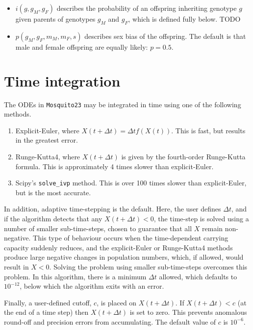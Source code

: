 \documentclass[11pt,a4paper]{article}
\begin{document}
\begin{itemize}
\begin{itemize}
\begin{equation}
\begin{array}{ll}
        (1 - s_{e})(1 - s_{n})  & \ \ \mbox{if}\ g\in\{cc\}
      \end{array}
      \right.
    \end{equation}
    Here $h_{e}$, $s_{e}$, $h_{n}$ and $s_{n}$ are user-defined parameters.
  \item The denominator normalises the result
  \end{itemize}
\item $i(g, g_{M}, g_{F})$ describes the probability of an offspring inheriting genotype $g$ given parents of genotypes $g_{M}$ and $g_{F}$, which is defined fully below.  TODO
\item $p(g_{M}, g_{F}, m_{M}, m_{F}, s)$ describes sex bias of the offspring.  The default is that male and female offspring are equally likely: $p=0.5$.
\end{itemize}

\section{Time integration}

The ODEs in {\tt Mosquito23} may be integrated in time using one of the following methods.
\begin{enumerate}
\item Explicit-Euler, where $X(t + \Delta t) = \Delta t f(X(t))$.  This is fast, but results in the greatest error.
\item Runge-Kutta4, where $X(t + \Delta t)$ is given by the fourth-order Runge-Kutta formula.  This is approximately 4 times slower than explicit-Euler.
\item Scipy's {\tt solve\_ivp} method.  This is over 100 times slower than explicit-Euler, but is the most accurate.
\end{enumerate}

In addition, adaptive time-stepping is the default.  Here, the user defines $\Delta t$, and if the algorithm detects that any $X(t + \Delta t) < 0$, the time-step is solved using a number of smaller sub-time-steps, chosen to guarantee that all $X$ remain non-negative.  This type of behaviour occurs when the time-dependent carrying capacity suddenly reduces, and the explicit-Euler or Runge-Kutta4 methods produce large negative changes in population numbers, which, if allowed, would result in $X<0$.  Solving the problem using smaller sub-time-steps overcomes this problem.  In this algorithm, there is a minimum $\Delta t$ allowed, which defaults to $10^{-12}$, below which the algorithm exits with an error.

Finally, a user-defined cutoff, $c$, is placed on $X(t + \Delta t)$.  If $X(t + \Delta t) < c$ (at the end of a time step) then $X(t + \Delta t)$ is set to zero.  This prevents anomalous round-off and precision errors from accumulating.  The default value of $c$ is $10^{-6}$.
\end{document}
